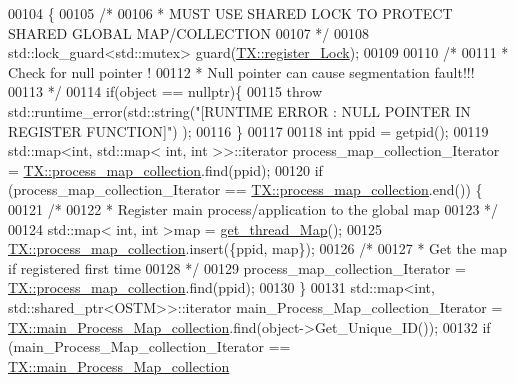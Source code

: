 \begin{DoxyCode}
00104                                              \{
00105     \textcolor{comment}{/*}
00106 \textcolor{comment}{     * MUST USE SHARED LOCK TO PROTECT SHARED GLOBAL MAP/COLLECTION 
}
00107 \textcolor{comment}{     */}
00108     std::lock\_guard<std::mutex> guard(\hyperlink{class_t_x_aa688a8c96fa3cdf8cd92e267463536dc_aa688a8c96fa3cdf8cd92e267463536dc}{TX::register\_Lock});
00109     
00110     \textcolor{comment}{/*}
00111 \textcolor{comment}{     * Check for null pointer !
}
00112 \textcolor{comment}{     * Null pointer can cause segmentation fault!!!
}
00113 \textcolor{comment}{     */}
00114     \textcolor{keywordflow}{if}(\textcolor{keywordtype}{object} == \textcolor{keyword}{nullptr})\{
00115         \textcolor{keywordflow}{throw} std::runtime\_error(std::string(\textcolor{stringliteral}{"[RUNTIME ERROR : NULL POINTER IN REGISTER FUNCTION]"}) );
00116     \}
00117     
00118     \textcolor{keywordtype}{int} ppid = getpid();
00119     std::map<int, std::map< int, int >>::iterator process\_map\_collection\_Iterator = 
      \hyperlink{class_t_x_aea5b8eedcd5059384155576b3979a5f6_aea5b8eedcd5059384155576b3979a5f6}{TX::process\_map\_collection}.find(ppid);
00120     \textcolor{keywordflow}{if} (process\_map\_collection\_Iterator == \hyperlink{class_t_x_aea5b8eedcd5059384155576b3979a5f6_aea5b8eedcd5059384155576b3979a5f6}{TX::process\_map\_collection}.end()) \{
00121         \textcolor{comment}{/*}
00122 \textcolor{comment}{         * Register main process/application to the global map
}
00123 \textcolor{comment}{         */}
00124         std::map< int, int >map =  \hyperlink{class_t_x_a3f5671423cb7b9f9c98f8a25f2a4b545_a3f5671423cb7b9f9c98f8a25f2a4b545}{get\_thread\_Map}();
00125         \hyperlink{class_t_x_aea5b8eedcd5059384155576b3979a5f6_aea5b8eedcd5059384155576b3979a5f6}{TX::process\_map\_collection}.insert(\{ppid, map\});
00126         \textcolor{comment}{/*}
00127 \textcolor{comment}{         * Get the map if registered first time
}
00128 \textcolor{comment}{         */}
00129         process\_map\_collection\_Iterator = \hyperlink{class_t_x_aea5b8eedcd5059384155576b3979a5f6_aea5b8eedcd5059384155576b3979a5f6}{TX::process\_map\_collection}.find(ppid);
00130     \}
00131     std::map<int, std::shared\_ptr<OSTM>>::iterator main\_Process\_Map\_collection\_Iterator = 
      \hyperlink{class_t_x_a1a45d726894190695314464d7cd97c29_a1a45d726894190695314464d7cd97c29}{TX::main\_Process\_Map\_collection}.find(object->Get\_Unique\_ID());
00132     \textcolor{keywordflow}{if} (main\_Process\_Map\_collection\_Iterator == \hyperlink{class_t_x_a1a45d726894190695314464d7cd97c29_a1a45d726894190695314464d7cd97c29}{TX::main\_Process\_Map\_collection}

\end{DoxyCode}
